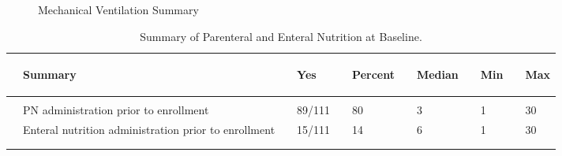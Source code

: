 \documentclass[dvips,10pt]{article}
\begin{document}
\begin{figure}
\caption{Mechanical Ventilation Summary}
\end{figure}
\clearpage
\begin{table}[t]
\caption
{ Summary of Parenteral and Enteral Nutrition at Baseline. }
\begin{center}
\begin{tabular}{ l
lp{1.5em}lp{1.5em}lp{1.5em}lp{1.5em}lp{1.5em}l
}
\hline

& \parbox{0em}{\begin{center}Summary\end{center}} && \parbox{0em}{\begin{center}Yes\end{center}} && \parbox{0em}{\begin{center}Percent\end{center}} && \parbox{0em}{\begin{center}Median\end{center}} && \parbox{0em}{\begin{center}Min\end{center}} && \parbox{0em}{\begin{center}Max\end{center}} \\

\hline

\\
& PN administration prior to enrollment && 89/111 && 80 && 3 && 1 && 30 \\
& Enteral nutrition administration prior to enrollment && 15/111 && 14 && 6 && 1 && 30 \\
\\
\hline \\

\end{tabular}

\end{center}
 \end{table}
\end{document}
